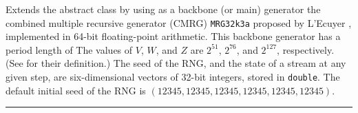 
Extends the abstract class  by using as a
backbone (or main) generator the combined multiple recursive
generator (CMRG) \texttt{MRG32k3a} proposed by L'Ecuyer \cite{rLEC99b},
implemented in 64-bit floating-point arithmetic.
This backbone generator has a period length of
   
The values of $V$, $W$, and $Z$ are $2^{51}$, $2^{76}$, and $2^{127}$,
respectively. (See  for their definition.)
The seed of the RNG, and the state of a stream at any given step,
are six-dimensional vectors of 32-bit integers, stored in \texttt{double}.
The default initial seed of the RNG is
$(12345, 12345, 12345, 12345, 12345, 12345)$.


\bigskip\hrule

